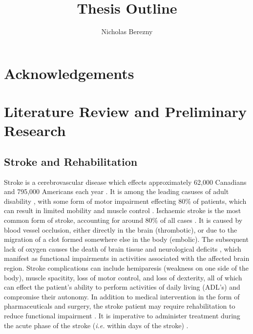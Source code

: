 \documentclass[12pt]{report}
\author{Nicholas Berezny}
\title{Thesis Outline}
\begin{document}
\maketitle
\newpage

\chapter*{Acknowledgements}

\tableofcontents
\listoffigures
\listoftables

\chapter{Literature Review and Preliminary Research}


\section{Stroke and Rehabilitation}

Stroke is a cerebrovascular disease which effects approximately 62,000 Canadians and 795,000 Americans each year \cite{Benjamin2018,Hebert2016}. It is among the leading casuses of adult disability \cite{Ewart2003}, with some form of motor impairment effecting 80\% of patients, which can result in limited mobility and muscle control \cite{Langhorne2009}. Ischaemic stroke is the most common form of stroke, accounting for around 80\% of all cases \cite{Rey2008}. It is caused by blood vessel occlusion, either directly in the brain (thrombotic), or due to the migration of a clot formed somewhere else in the body (embolic). The subsequent lack of oxygen causes the death of brain tissue and neurological deficits \cite{Prabhakaran2015}, which manifest as functional impairments in activities associated with the affected brain region. Stroke complications can include hemiparesis (weakness on one side of the body), muscle spacitity, loss of motor control, and loss of dexterity, all of which can effect the patient's ability to perform activities of daily living (ADL's) and compromise their autonomy. In addition to medical intervention in the form of pharmaceuticals and surgery, the stroke patient may require rehabilitation to reduce functional impairment \cite{Stroke}. It is imperative to administer treatment during the acute phase of the stroke (\textit{i.e.} within days of the stroke) \cite{Prabhakaran2015}.

\end{document}

